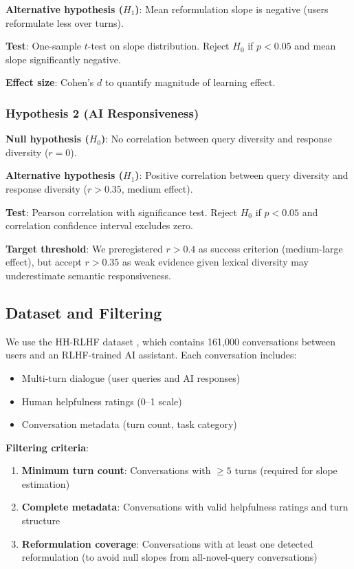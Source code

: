 \textbf{Alternative hypothesis ($H_1$)}: Mean reformulation slope is negative (users reformulate less over turns).

\textbf{Test}: One-sample $t$-test on slope distribution. Reject $H_0$ if $p < 0.05$ and mean slope significantly negative.

\textbf{Effect size}: Cohen's $d$ to quantify magnitude of learning effect.

\subsubsection{Hypothesis 2 (AI Responsiveness)}

\textbf{Null hypothesis ($H_0$)}: No correlation between query diversity and response diversity ($r = 0$).

\textbf{Alternative hypothesis ($H_1$)}: Positive correlation between query diversity and response diversity ($r > 0.35$, medium effect).

\textbf{Test}: Pearson correlation with significance test. Reject $H_0$ if $p < 0.05$ and correlation confidence interval excludes zero.

\textbf{Target threshold}: We preregistered $r > 0.4$ as success criterion (medium-large effect), but accept $r > 0.35$ as weak evidence given lexical diversity may underestimate semantic responsiveness.

\subsection{Dataset and Filtering}

We use the HH-RLHF dataset \cite{bai2022constitutional}, which contains 161,000 conversations between users and an RLHF-trained AI assistant. Each conversation includes:

\begin{itemize}
\item Multi-turn dialogue (user queries and AI responses)
\item Human helpfulness ratings (0--1 scale)
\item Conversation metadata (turn count, task category)
\end{itemize}

\textbf{Filtering criteria}:

\begin{enumerate}
\item \textbf{Minimum turn count}: Conversations with $\geq 5$ turns (required for slope estimation)
\item \textbf{Complete metadata}: Conversations with valid helpfulness ratings and turn structure
\item \textbf{Reformulation coverage}: Conversations with at least one detected reformulation (to avoid null slopes from all-novel-query conversations)
\end{enumerate}

